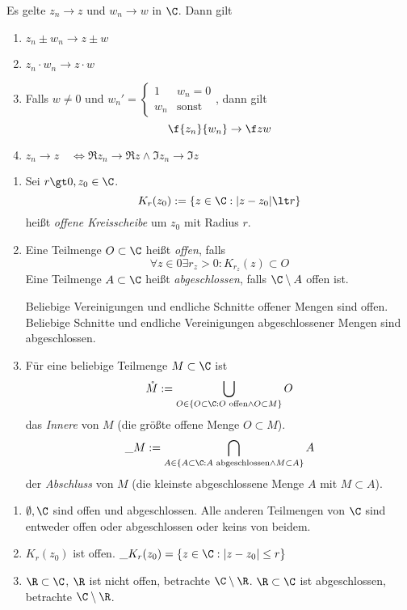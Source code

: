 \documentclass[a4paper,10pt]{scrartcl}
\begin{document}
\begin{st}
	\label{st:1.6}
	Es gelte $z_n\to z$ und $w_n \to w$ in $\C$.
	Dann gilt
	\begin{enumerate}
		\item $z_n \pm w_n \to z \pm w$ 
		\item $z_n\cdot w_n \to z\cdot w$
		\item
			Falls $w\neq 0$ und $w_n' = \begin{cases} 1 & w_n=0 \\ w_n & \text{sonst}\end{cases}$, dann gilt
			\[
				\f {z_n}{w_n} \to \f zw
			\]
		\item $z_n\to z \quad\iff \Re z_n \to \Re z \land  \Im z_n \to \Im z$

	\end{enumerate}
\end{st}

\begin{df}
	\label{df:1.7}
	\begin{enumerate}
		\item 
			Sei $r\gt 0, z_0\in \C$.
			\[
				K_r(z_0) := \{z\in \C : |z-z_0| \lt r\}
			\]
			heißt \emph{offene Kreisscheibe} um $z_0$ mit Radius $r$.
		\item
			Eine Teilmenge $O \subset \C$ heißt \emph{offen}, falls
			\[
				\forall z\in 0 \exists r_z \gt 0 : K_{r_z}(z) \subset O
			\]
			Eine Teilmenge $A \subset \C$ heißt \emph{abgeschlossen}, falls $\C\setminus A$ offen ist.

			Beliebige Vereinigungen und endliche Schnitte offener Mengen sind offen.
			Beliebige Schnitte und endliche Vereinigungen abgeschlossener Mengen sind abgeschlossen.
		\item
			Für eine beliebige Teilmenge $M\subset \C$ ist
			\[
				\mathring M := \bigcup_{O\in \{O\subset \C: O \text{ offen} \land O \subset M\}} O
			\]
			das \emph{Innere} von $M$ (die größte offene Menge $O\subset M$).
			\[
				\_M := \bigcap_{A\in \{A\subset \C: A \text{ abgeschlossen} \land M \subset A\}} A
			\]
			der \emph{Abschluss} von $M$ (die kleinste abgeschlossene Menge $A$ mit $M\subset A$).
	\end{enumerate}
\end{df}

\begin{ex}
	\label{ex:1.8}
	\begin{enumerate}
		\item 
			$\emptyset, \C$ sind offen und abgeschlossen. 
			Alle anderen Teilmengen von $\C$ sind entweder offen oder abgeschlossen oder keins von beidem.
		\item
			$K_r(z_0)$ ist offen. $\_{K_r(z_0)}=\{z\in \C : |z -z_0| \le r\}$
		\item
			$\R\subset \C$, $\R$ ist nicht offen, betrachte $\C\setminus \R$.
			$\R\subset \C$ ist abgeschlossen, betrachte $\C\setminus \R$.			
	\end{enumerate}
\end{ex}
\end{document}
